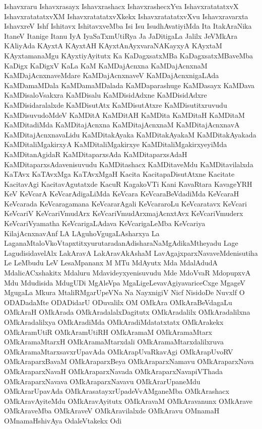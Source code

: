 {Ishavxraru
Ishavxrasayx
Ishavxrashacx
IshavxrashecxYva
IshavxratatatxvX
IshavxratatatxvXM
IshavxratatatxvXkekx
IshavxratatatxvXvu
Ishavxravarxta
IshavxreV
Ishf
Ishitavx
IshitavxveMba
Isi
Isu
IsudhAvatiyiMda
Ita
ItakAraNika
ItaneV
Itanige
Itanu
IyA
IyaSaTxmUtiRya
Ja
JaDitigaLa
Jalilx
JeVMkAra
KAliyAda
KAyxtA
KAyxtAH
KAyxtAnAyxvaraNAKayxyA
KAyxtaM
KAyxtamanaMgu
KAyxtiyAyitutx
Ka
KaDagxsatxMBa
KaDagxsatxMBaveMba
KaDigx
KaDigxV
KaLa
KaM
KaMDajAcnxna
KaMDajAcnxnaM
KaMDajAcnxnaveMdare
KaMDajAcnxnaveV
KaMDajAcnxnigaLAda
KaMDamaMDala
KaMDamaMDalada
KaMDaparashuge
KaMDasayx
KaMDava
KaMDisaloVsakxra
KaMDisalu
KaMDisidAdxne
KaMDisidAdxre
KaMDisidaralalxde
KaMDisutAtx
KaMDisutAtxre
KaMDisutitxruvudu
KaMDisuvudoMdeV
KaMDitA
KaMDitAH
KaMDita
KaMDitaH
KaMDitaM
KaMDitadiMda
KaMDitajAcnxna
KaMDitajAcnxnaM
KaMDitajAcnxnavA
KaMDitajAcnxnavaLidu
KaMDitakAyaka
KaMDitakAyakaM
KaMDitakAyakada
KaMDitaliMgakirxyA
KaMDitaliMgakirxye
KaMDitaliMgakirxyeyiMda
KaMDitanAgidaR
KaMDitaparxsAda
KaMDitaparxsAdaH
KaMDitaparxsAdavenisuvudu
KaMDitashacx
KaMDitaveMdu
KaMDitavilalxda
KaTAvx
KaTAvxMga
KaTAvxMgaH
Kacita
KacitapaDisutAtxne
Kacitate
KacitavAgi
KacitavAgutatxde
KacuR
KagakoVTi
Kani
KavaRtara
KavageYRH
KeV
KeVcarA
KeVcarAdigaLiMda
KeVcara
KeVcaraBeVdadiMda
KeVcaraH
KeVcarada
KeVcaragamana
KeVcararAgali
KeVcararoLu
KeVcaratavx
KeVcari
KeVcariV
KeVcariVmudArx
KeVcariVmudArxmajAcnxtAvx
KeVcariVmuderx
KeVcariVyamatha
KeVcarigaLAdava
KeVcarigaLeMba
KeVcariya
KilajAcnxnavAnf
LA
LAguhoVgugaLAsharxya
La
LaganaMtaloVkoVtapxtitxyurutaradanAdisharaNaMgAdikaMtheyadu
Lage
LagudisidavelAlx
LakAravA
LakAravAkAshaM
LavAgajxparxNavaveMdenisutiha
Le
LeMbudu
LeV
LesaMpananx
M
MTu
MdAyutx
Mda
MdalAdudA
MdalicACxshakitx
Mdaluru
Mdavideyxyenisuvudu
Mde
MdoVvaR
MdopupxvA
Mdu
Mdudisida
MdugUDi
MgAleVpa
MgaLigeLevavAgiyavariceCxge
MgageV
MgugaLa
Mkura
MtaliRMgarUpeVNa
Na
NayxnigiV
Nicf
NisidoDe
Nuvxlf
O
ODADadaMte
ODADidarU
ODuvalilx
OM
OMkAra
OMkAraBeVdagaLu
OMkAraH
OMkArada
OMkAradalalxDagitutx
OMkAradalilx
OMkAradalilxna
OMkAradalilxya
OMkAradiMda
OMkAradiMdatatxtatx
OMkArakekx
OMkAramUtiR
OMkAramUtiRH
OMkAramaM
OMkAramaMtarx
OMkAramaMtarxH
OMkAramaMtarxdali
OMkAramaMtarxdalilxruva
OMkAramaMtarxsavxrUpavAda
OMkArapUvaRkavAgi
OMkArapUvoRV
OMkAraparxBavaM
OMkAraparxBeya
OMkAraparxNamavu
OMkAraparxNava
OMkAraparxNavaH
OMkAraparxNavada
OMkAraparxNavapiVThada
OMkAraparxNavava
OMkAraparxNavavu
OMkArarUpaneMdu
OMkArarUpavAda
OMkArasatayxrUpadeVvAMganeMba
OMkArashacx
OMkAravAyiteMdu
OMkAravAyitutx
OMkAravaM
OMkAravanunx
OMkArave
OMkAraveMba
OMkAraveV
OMkAravilalxde
OMkAravu
OMnamaH
OMnamaHshivAya
OdaleVtakekx
Odi
}
